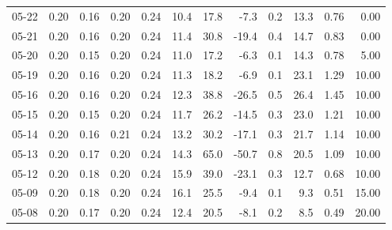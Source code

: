 \begin{threeparttable}
{\begin{tabular}{lrrrrrrrrrrr}
  05-22 &          0.20 &          0.16 &          0.20 &        0.24 &                10.4 &                17.8 &       -7.3 &                 0.2 &             13.3 &            0.76 &                   0.00 \\
  05-21 &          0.20 &          0.16 &          0.20 &        0.24 &                11.4 &                30.8 &      -19.4 &                 0.4 &             14.7 &            0.83 &                   0.00 \\
  05-20 &          0.20 &          0.15 &          0.20 &        0.24 &                11.0 &                17.2 &       -6.3 &                 0.1 &             14.3 &            0.78 &                   5.00 \\
  05-19 &          0.20 &          0.16 &          0.20 &        0.24 &                11.3 &                18.2 &       -6.9 &                 0.1 &             23.1 &            1.29 &                  10.00 \\
  05-16 &          0.20 &          0.16 &          0.20 &        0.24 &                12.3 &                38.8 &      -26.5 &                 0.5 &             26.4 &            1.45 &                  10.00 \\
  05-15 &          0.20 &          0.15 &          0.20 &        0.24 &                11.7 &                26.2 &      -14.5 &                 0.3 &             23.0 &            1.21 &                  10.00 \\
  05-14 &          0.20 &          0.16 &          0.21 &        0.24 &                13.2 &                30.2 &      -17.1 &                 0.3 &             21.7 &            1.14 &                  10.00 \\
  05-13 &          0.20 &          0.17 &          0.20 &        0.24 &                14.3 &                65.0 &      -50.7 &                 0.8 &             20.5 &            1.09 &                  10.00 \\
  05-12 &          0.20 &          0.18 &          0.20 &        0.24 &                15.9 &                39.0 &      -23.1 &                 0.3 &             12.7 &            0.68 &                  10.00 \\
  05-09 &          0.20 &          0.18 &          0.20 &        0.24 &                16.1 &                25.5 &       -9.4 &                 0.1 &              9.3 &            0.51 &                  15.00 \\
  05-08 &          0.20 &          0.17 &          0.20 &        0.24 &                12.4 &                20.5 &       -8.1 &                 0.2 &              8.5 &            0.49 &                  20.00 \\

\end{tabular}}
\end{threeparttable}
